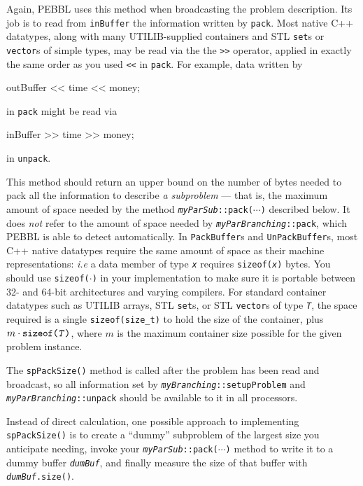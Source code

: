 Again, PEBBL
uses this method when broadcasting the problem description.  Its job
is to read from
\texttt{inBuffer} the information written by \texttt{pack}.  Most native C++
datatypes, along with many UTILIB-supplied containers and STL
\texttt{set}s or
\texttt{vector}s of simple types, may be read via
the the \texttt{>>} operator, applied in exactly the same order as you
used \texttt{<<} in \texttt{pack}.  For example, data written by
\begin{codeblock}
outBuffer << time << money;
\end{codeblock}
in \texttt{pack} might be read via
\begin{codeblock}
inBuffer >> time >> money;
\end{codeblock}
in \texttt{unpack}.  

 This method should return an upper bound on
the number of bytes needed to pack all the information to describe
\emph{a subproblem} --- that is, the maximum amount of space needed by
the method \texttt{\emph{myParSub}::pack($\cdots$)} described below.
It does \emph{not} refer to the amount of space needed by
\texttt{\emph{myParBranching}::pack}, which PEBBL is able to detect
automatically. In \texttt{PackBuffer}s and \texttt{UnPackBuffer}s,
most C++ native datatypes require the same amount of space as their
machine representations: \emph{i.e} a data member of type
\texttt{\emph{x}} requires \texttt{sizeof(\emph{x})} bytes.  You
should use \texttt{sizeof($\cdot$)} in your implementation to make
sure it is portable between 32- and 64-bit architectures and varying
compilers.  For standard container datatypes such as 
UTILIB arrays, STL \texttt{set}s, or STL
\texttt{vector}s of type \texttt{\emph{T}}, the space required is a single
\texttt{sizeof(size\_t)} to hold the size of the container, plus
$m\cdot\text{\texttt{sizeof(\emph{T})}}$, where $m$ is the maximum
container size possible for the given problem instance.

The \texttt{spPackSize()} method is
called after the problem has been read and broadcast, so all
information set by \texttt{\emph{myBranching}::setupProblem} and
\texttt{\emph{myParBranching}::unpack} should be available to it in all
processors.

Instead of direct calculation, one possible approach to implementing
\texttt{spPackSize()} is to create a ``dummy'' subproblem of the largest
size you anticipate needing, invoke your \texttt{\emph{myParSub}::pack($\cdots$)}
method to write it to a dummy buffer \texttt{\emph{dumBuf}}, and finally measure
the size of that buffer with \texttt{\emph{dumBuf}.size()}.


